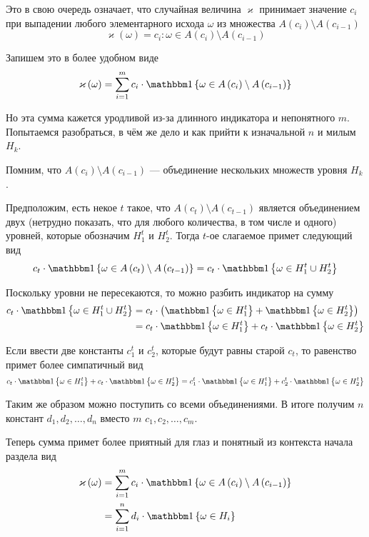 Это в свою очередь означает,
что случайная величина $\varkappa$ принимает значение $c_i$
при выпадении любого элементарного исхода $\omega$
из множества $A\left( c_{i} \right) \setminus A\left( c_{i-1} \right)$
$$\varkappa\left( \omega \right) = c_i:
    \omega \in A\left( c_{i} \right) \setminus A\left( c_{i-1} \right)$$

Запишем это в более удобном виде
$$\varkappa\left( \omega \right)
    = \sum_{i=1}^m c_i \cdot \Indicator{\omega
        \in A\left( c_{i} \right) \setminus A\left( c_{i-1} \right)}$$

Но эта сумма кажется уродливой из-за длинного индикатора и непонятного $m$.
Попытаемся разобраться,
в чём же дело и как прийти к изначальной $n$ и милым $H_k$.

Помним, что $A\left( c_{i} \right) \setminus A\left( c_{i-1} \right)$ ---
объединение нескольких множеств уровня $H_k$.

Предположим, есть некое $t$ такое,
что $A\left( c_{t} \right) \setminus A\left( c_{t-1} \right)$
является объединением двух
(нетрудно показать, что для любого количества, в том числе и одного)
уровней, которые обозначим $H_1^t$ и $H_2^t$.
Тогда $t$-ое слагаемое примет следующий вид
$$c_t \cdot \Indicator{\omega \in
    A\left( c_{t} \right) \setminus A\left( c_{t-1} \right)}
    = c_t \cdot \Indicator{\omega \in H_1^t \cup H_2^t}$$

Поскольку уровни не пересекаются, то можно разбить индикатор на сумму
\begin{align*}
c_t \cdot \Indicator{\omega \in H_1^t \cup H_2^t}
    &= c_t \cdot \left( \Indicator{\omega \in H_1^t}
        + \Indicator{\omega \in H_2^t} \right) \\
    &= c_t \cdot \Indicator{\omega \in H_1^t}
        + c_t \cdot \Indicator{\omega \in H_2^t}
\end{align*}

Если ввести две константы $c_1^t$ и $c_2^t$, которые будут равны старой $c_t$,
то равенство примет более симпатичный вид
$$c_t \cdot \Indicator{\omega \in H_1^t}
    + c_t \cdot \Indicator{\omega \in H_2^t}
    = c_1^t \cdot \Indicator{\omega \in H_1^t}
    + c_2^t \cdot \Indicator{\omega \in H_2^t}$$

Таким же образом можно поступить со всеми объединениями.
В итоге получим $n$ констант $d_1, d_2, \dots, d_n$
вместо $m$ $c_1, c_2, \dots, c_m$.

Теперь сумма примет более приятный для глаз
и понятный из контекста начала раздела вид
\begin{align*}
    \varkappa\left( \omega \right)
        &= \sum_{i=1}^m c_i \cdot \Indicator{\omega
            \in A\left( c_{i} \right) \setminus A\left( c_{i-1} \right)} \\
        &= \sum_{i=1}^n d_i \cdot \Indicator{\omega \in H_i}
\end{align*}

